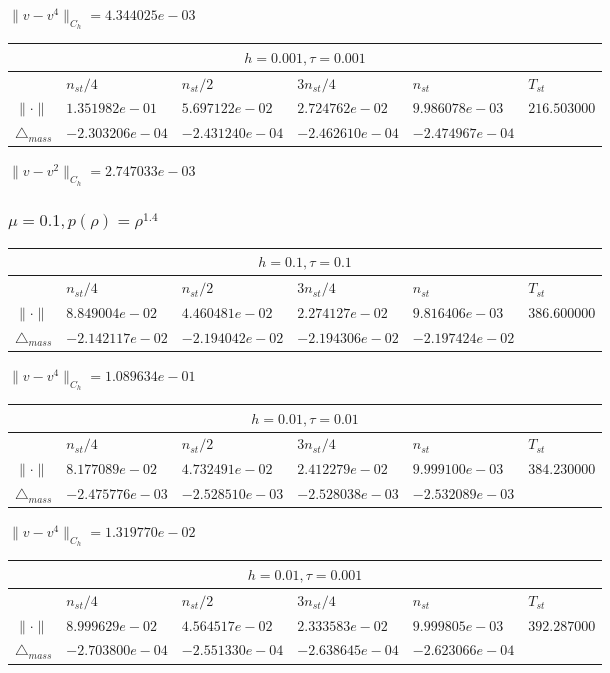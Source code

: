 $\|v-v^{4}\|_{C_h} = 4.344025e-03$

\begin{tabular}{*{6}{|l}|}
    \hline
     \\
    \hline
    &$n_{st}/4 $&$ n_{st}/2$&$3n_{st}/4$&$n_{st}$&$T_{st}$ \\
    \hline
    $\|\cdot \|$& $1.351982e-01$ & $5.697122e-02$ & $2.724762e-02$ & $9.986078e-03$ &$216.503000$\\
\hline
$\triangle_{mass}$& $-2.303206e-04$ & $-2.431240e-04$ & $-2.462610e-04$ & $-2.474967e-04$ &\\
\hline
\end{tabular}

$\|v-v^{2}\|_{C_h} = 2.747033e-03$

\subsubsection{$\mu = 0.1, p(\rho) = \rho^{1.4} $}
\begin{tabular}{*{6}{|l}|}
    \hline
     \\
    \hline
    &$n_{st}/4 $&$ n_{st}/2$&$3n_{st}/4$&$n_{st}$&$T_{st}$ \\
    \hline
    $\|\cdot \|$& $8.849004e-02$ & $4.460481e-02$ & $2.274127e-02$ & $9.816406e-03$ &$386.600000$\\
\hline
$\triangle_{mass}$& $-2.142117e-02$ & $-2.194042e-02$ & $-2.194306e-02$ & $-2.197424e-02$ &\\
\hline
\end{tabular}

$\|v-v^{4}\|_{C_h} = 1.089634e-01$

\begin{tabular}{*{6}{|l}|}
    \hline
     \\
    \hline
    &$n_{st}/4 $&$ n_{st}/2$&$3n_{st}/4$&$n_{st}$&$T_{st}$ \\
    \hline
    $\|\cdot \|$& $8.177089e-02$ & $4.732491e-02$ & $2.412279e-02$ & $9.999100e-03$ &$384.230000$\\
\hline
$\triangle_{mass}$& $-2.475776e-03$ & $-2.528510e-03$ & $-2.528038e-03$ & $-2.532089e-03$ &\\
\hline
\end{tabular}

$\|v-v^{4}\|_{C_h} = 1.319770e-02$

\begin{tabular}{*{6}{|l}|}
    \hline
     \\
    \hline
    &$n_{st}/4 $&$ n_{st}/2$&$3n_{st}/4$&$n_{st}$&$T_{st}$ \\
    \hline
    $\|\cdot \|$& $8.999629e-02$ & $4.564517e-02$ & $2.333583e-02$ & $9.999805e-03$ &$392.287000$\\
\hline
$\triangle_{mass}$& $-2.703800e-04$ & $-2.551330e-04$ & $-2.638645e-04$ & $-2.623066e-04$ &\\
\hline
\end{tabular}

